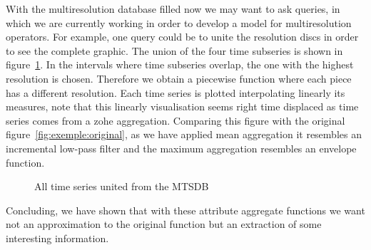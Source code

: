 %   



With the multiresolution database filled now we may want to ask
queries, in which we are currently working in order to develop a model
for multiresolution operators.  For example, one query could be to
unite the resolution discs in order to see the complete graphic.  The
union of the four time subseries is shown in
figure~\ref{fig:exemple:4mrdtot}.  In the intervals where time
subseries overlap, the one with the highest resolution is
chosen. Therefore we obtain a piecewise function where each piece has
a different resolution.  Each time series is plotted interpolating
linearly its measures, note that this linearly visualisation seems
right time displaced as time series comes from a zohe aggregation.
Comparing this figure with the original
figure~\ref{fig:exemple:original}, as we have applied mean aggregation
it resembles an incremental low-pass filter and the maximum
aggregation resembles an envelope function. 

\begin{figure}[tp]
  \centering
  
  \caption{All time series united from the MTSDB}
  \label{fig:exemple:4mrdtot}
\end{figure}


Concluding, we have shown that with these attribute aggregate
functions we want not an approximation to the original function but an
extraction of some interesting information.





